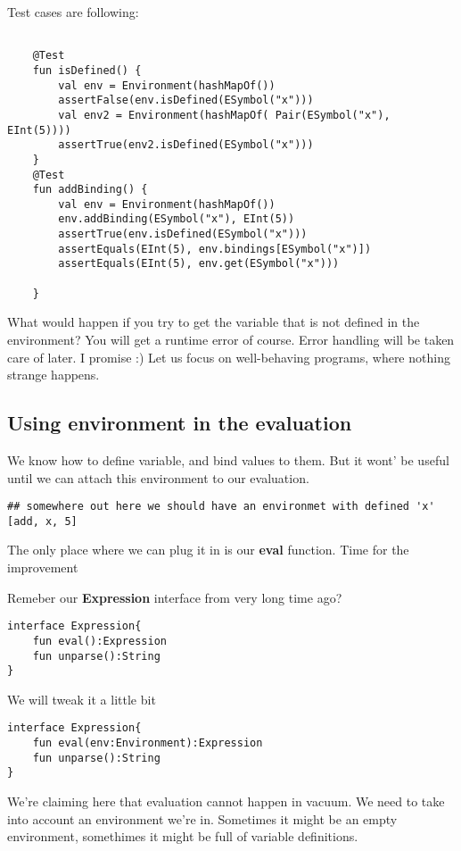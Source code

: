 \documentclass[11pt]{article}
\begin{document}
Test cases are following:

\begin{verbatim}

    @Test
    fun isDefined() {
        val env = Environment(hashMapOf())
        assertFalse(env.isDefined(ESymbol("x")))
        val env2 = Environment(hashMapOf( Pair(ESymbol("x"), EInt(5))))
        assertTrue(env2.isDefined(ESymbol("x")))
    }
    @Test
    fun addBinding() {
        val env = Environment(hashMapOf())
        env.addBinding(ESymbol("x"), EInt(5))
        assertTrue(env.isDefined(ESymbol("x")))
        assertEquals(EInt(5), env.bindings[ESymbol("x")])
        assertEquals(EInt(5), env.get(ESymbol("x")))

    }
\end{verbatim}

What would happen if you try to get the variable that is not defined in the environment?
You will get a runtime error of course. Error handling will be taken care of later. I promise :)
Let us focus on well-behaving programs, where nothing strange happens.

\subsection{Using environment in the evaluation}
\label{sec:org6c5c509}
We know how to define variable, and bind values to them.
But it wont' be useful until we can attach this environment to our evaluation.
\begin{verbatim}
## somewhere out here we should have an environmet with defined 'x'
[add, x, 5]
\end{verbatim}

The only place where we can plug it in is our \textbf{eval} function.
Time for the improvement

Remeber our \textbf{Expression} interface from very long time ago?
\begin{verbatim}
interface Expression{
    fun eval():Expression
    fun unparse():String
}
\end{verbatim}

We will tweak it a little bit

\begin{verbatim}
interface Expression{
    fun eval(env:Environment):Expression
    fun unparse():String
}
\end{verbatim}

We're claiming here that evaluation cannot happen in vacuum. We need to take into account an environment we're in.
Sometimes it might be an empty environment, somethimes it might be full of variable definitions.
\end{document}
